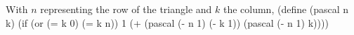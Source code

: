 With $n$ representing the row of the triangle and $k$ the column, 
\begtt\scm
(define (pascal n k)
  (if (or (= k 0) (= k n))
      1
      (+ (pascal (- n 1) (- k 1))
         (pascal (- n 1) k))))
\endtt
